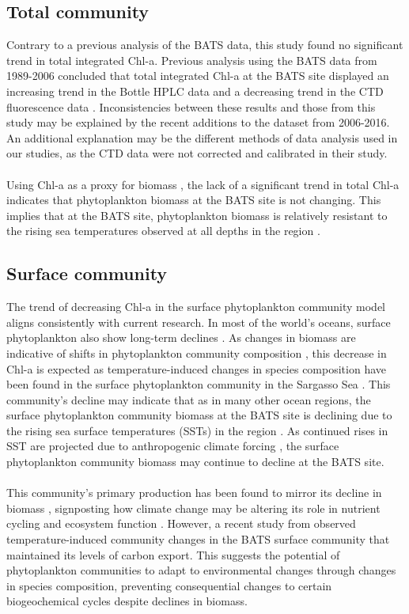 \documentclass{article}
\begin{document}
\subsection{Total community}
Contrary to a previous analysis of the BATS data, this study found no significant trend in total integrated Chl-a. Previous analysis using the BATS data from 1989-2006 concluded that total integrated Chl-a at the BATS site displayed an increasing trend in the Bottle HPLC data and a decreasing trend in the CTD fluorescence data \citep{saba_challenges_2010}. Inconsistencies between these results and those from this study may be explained by the recent additions to the dataset from 2006-2016. An additional explanation may be the different methods of data analysis used in our studies, as the CTD data were not corrected and calibrated in their study. \\ \\
Using Chl-a as a proxy for biomass \citep{boyce_global_2010}, the lack of a significant trend in total Chl-a indicates that phytoplankton biomass at the BATS site is not changing. This implies that at the BATS site, phytoplankton biomass is relatively resistant to the rising sea temperatures observed at all depths in the region \citep{joyce_long-term_1996,bonhommeau_fluctuations_2008}.
\subsection{Surface community}
The trend of decreasing Chl-a in the surface phytoplankton community model aligns consistently with current research. In most of the world’s oceans, surface phytoplankton also show long-term declines \citep{boyce_global_2010}. As changes in biomass are indicative of shifts in phytoplankton community composition \citep{mcquatters-gollop_long-term_2007}, this decrease in Chl-a is expected as temperature-induced changes in species composition have been found in the surface phytoplankton community in the Sargasso Sea \citep{lomas_adaptive_2022}. This community’s decline may indicate that as in many other ocean regions, the surface phytoplankton community biomass at the BATS site is declining due to the rising sea surface temperatures (SSTs) in the region \citep{boyce_global_2010,liu_variability_2019,sheppard_sea_2005}. As continued rises in SST are projected due to anthropogenic climate forcing \citep{sheppard_sea_2005,alexander_projected_2018}, the surface phytoplankton community biomass may continue to decline at the BATS site. \\ \\
This community’s primary production has been found to mirror its decline in biomass \citep{lomas_adaptive_2022}, signposting how climate change may be altering its role in nutrient cycling and ecosystem function \citep{mcmahon_millennial-scale_2015,winder_phytoplankton_2012}. However, a recent study from \citep{lomas_adaptive_2022} observed temperature-induced community changes in the BATS surface community that maintained its levels of carbon export. This suggests the potential of phytoplankton communities to adapt to environmental changes through changes in species composition, preventing consequential changes to certain biogeochemical cycles despite declines in biomass.
\end{document}
